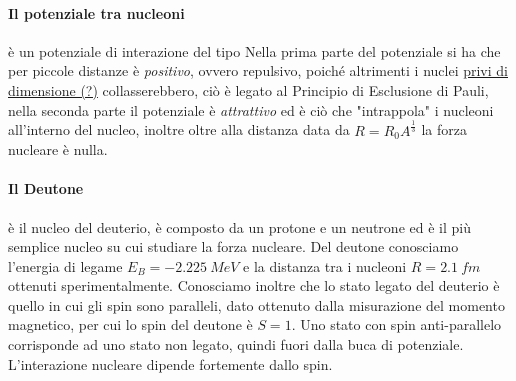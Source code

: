 \paragraph{Il potenziale tra nucleoni} è un potenziale di interazione del tipo
Nella prima parte del potenziale si ha che per piccole distanze è \emph{positivo}, ovvero repulsivo, poiché altrimenti i nuclei \underline{privi di dimensione (?)} collasserebbero, ciò è legato al Principio di Esclusione di Pauli, nella seconda parte il potenziale è \emph{attrattivo} ed è ciò che "intrappola" i nucleoni all'interno del nucleo, inoltre oltre alla distanza data da $R = R_0 A^{\frac{1}{3}}$ la forza nucleare è nulla.

\paragraph{Il Deutone} è il nucleo del deuterio, è composto da un protone e un neutrone ed è il più semplice nucleo su cui studiare la forza nucleare.
Del deutone conosciamo l'energia di legame $E_B = \SI{-2.225}{MeV}$ e la distanza tra i nucleoni $R = \SI{2.1}{fm}$ ottenuti sperimentalmente.
Conosciamo inoltre che lo stato legato del deuterio è quello in cui gli spin sono paralleli, dato ottenuto dalla misurazione del momento magnetico, per cui lo spin del deutone è $S = 1$.
Uno stato con spin anti-parallelo corrisponde ad uno stato non legato, quindi fuori dalla buca di potenziale.
L'interazione nucleare dipende fortemente dallo spin.

